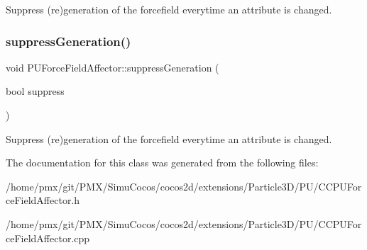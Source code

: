 Suppress (re)generation of the forcefield everytime an attribute is changed. \mbox{\label{classPUForceFieldAffector_ab9dd939076aa4e946bc9e7a26248e360}} 
\subsubsection{\texorpdfstring{suppress\+Generation()}{suppressGeneration()}\hspace{0.1cm}{\footnotesize\ttfamily [2/2]}}
{\footnotesize\ttfamily void P\+U\+Force\+Field\+Affector\+::suppress\+Generation (\begin{DoxyParamCaption}\item[{bool}]{suppress }\end{DoxyParamCaption})}

Suppress (re)generation of the forcefield everytime an attribute is changed. 

The documentation for this class was generated from the following files\+:\begin{DoxyCompactItemize}
\item 
/home/pmx/git/\+P\+M\+X/\+Simu\+Cocos/cocos2d/extensions/\+Particle3\+D/\+P\+U/C\+C\+P\+U\+Force\+Field\+Affector.\+h\item 
/home/pmx/git/\+P\+M\+X/\+Simu\+Cocos/cocos2d/extensions/\+Particle3\+D/\+P\+U/C\+C\+P\+U\+Force\+Field\+Affector.\+cpp\end{DoxyCompactItemize}
